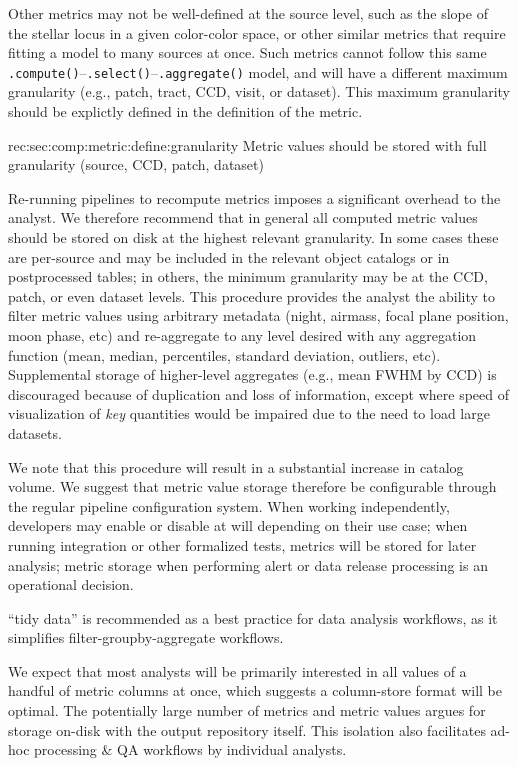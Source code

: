 Other metrics may not be well-defined at the source level, such as the slope of the stellar locus in a given color-color space, or other similar metrics that require fitting a model to many sources at once.
Such metrics cannot follow this same \texttt{.compute()}--\texttt{.select()}--\texttt{.aggregate()} model, and will have a different maximum granularity (e.g., patch, tract, CCD, visit, or dataset).
This maximum granularity should be explictly defined in the definition of the metric.

\begin{recommendation}
    {rec:sec:comp:metric:define:granularity}
    {Metric values should be stored with full granularity (source, CCD, patch, dataset)}
\end{recommendation}

Re-running pipelines to recompute metrics imposes a significant overhead to the analyst.
We therefore recommend that in general all computed metric values should be stored on disk at the highest relevant granularity.
In some cases these are per-source and may be included in the relevant object catalogs or in postprocessed tables; in others, the minimum granularity may be at the CCD, patch, or even dataset levels.
This procedure provides the analyst the ability to filter metric values using arbitrary metadata (night, airmass, focal plane position, moon phase, etc) and re-aggregate to any level desired with any aggregation function (mean, median, percentiles, standard deviation, outliers, etc).
Supplemental storage of higher-level aggregates (e.g., mean FWHM by CCD) is discouraged because of duplication and loss of information, except where speed of visualization of \emph{key} quantities would be impaired due to the need to load large datasets.

We note that this procedure will result in a substantial increase in catalog volume.
We suggest that metric value storage therefore be configurable through the regular pipeline configuration system.
When working independently, developers may enable or disable at will depending on their use case; when running integration or other formalized tests, metrics will be stored for later analysis; metric storage when performing alert or data release processing is an operational decision.

``\Gls{tidy data}'' is recommended as a best practice for data analysis workflows, as it simplifies filter-groupby-aggregate workflows.

We expect that most analysts will be primarily interested in all values of a handful of metric columns at once, which suggests a column-store format will be optimal.
The potentially large number of metrics and metric values argues for storage on-disk with the output repository itself.
This isolation also facilitates ad-hoc processing \& QA workflows by individual analysts.

